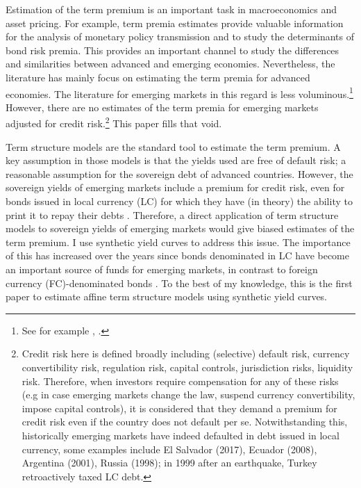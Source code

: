 Estimation of the term premium is an important task in macroeconomics and asset pricing. For example, term premia estimates provide valuable information for the analysis of monetary policy transmission and to study the determinants of bond risk premia. This provides an important channel to study the differences and similarities between advanced and emerging economies. Nevertheless, the literature has mainly focus on estimating the term premia for advanced economies. The literature for emerging markets in this regard is less voluminous.\footnote{See for example \cite*{DePooter_etal:2013}, \cite*{BlakeRuleRummel:2015}.} However, there are no estimates of the term premia for emerging markets adjusted for credit risk.\footnote{Credit risk here is defined broadly including (selective) default risk, currency convertibility risk, regulation risk, capital controls, jurisdiction risks, liquidity risk. Therefore, when investors require compensation for any of these risks (e.g in case emerging markets change the law, suspend currency convertibility, impose capital controls), it is considered that they demand a premium for credit risk even if the country does not default per se. Notwithstanding this, historically emerging markets have indeed defaulted in debt issued in local currency, some examples include El Salvador (2017), Ecuador (2008), Argentina (2001), Russia (1998); in 1999 after an earthquake, Turkey retroactively taxed LC debt.} This paper fills that void.

Term structure models are the standard tool to estimate the term premium. A key assumption in those models is that the yields used are free of default risk; a reasonable assumption for the sovereign debt of advanced countries. However, the sovereign yields of emerging markets include a premium for credit risk, even for bonds issued in local currency (LC) for which they have (in theory) the ability to print it to repay their debts \citep{DuSchreger:2016a}. Therefore, a direct application of term structure models to sovereign yields of emerging markets would give biased estimates of the term premium. I use synthetic yield curves to address this issue. The importance of this has increased over the years since bonds denominated in LC have become an important source of funds for emerging markets, in contrast to foreign currency (FC)-denominated bonds \citep{DuSchreger:2016b}. To the best of my knowledge, this is the first paper to estimate affine term structure models using synthetic yield curves.

